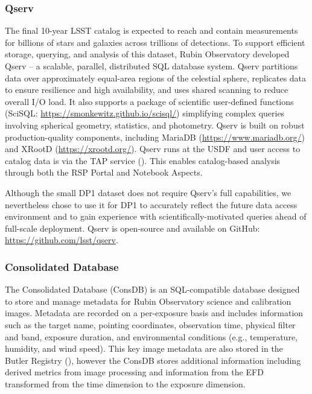 \subsubsection{Qserv}
\label{sssec:qserv}
The final 10-year \gls{LSST} catalog is expected to reach \tenyearcatalogsize and contain measurements for billions of stars and galaxies across trillions of detections.
To support efficient storage, querying, and analysis of this dataset,  Rubin Observatory developed Qserv \citep{Wang:2011:QDS:2063348.2063364, C15_adassxxxii} -- a scalable, parallel, distributed SQL database system.
\gls{Qserv} partitions data over approximately equal-area regions of the celestial sphere, replicates data to ensure resilience and high availability, and uses shared scanning to reduce overall I/O load.
It also supports a package of scientific user-defined functions (SciSQL: \url{https://smonkewitz.github.io/scisql/}) simplifying complex queries involving spherical geometry, statistics, and photometry.
\gls{Qserv} is built on robust production-quality components, including MariaDB (\url{https://www.mariadb.org/}) and XRootD (\url{https://xrootd.org/}).
Qserv runs at the \gls{USDF} and user access to catalog data is via the TAP service ().
This enables catalog-based analysis through both the \gls{RSP} Portal and Notebook Aspects.

Although the small \gls{DP1} dataset does not require Qserv’s full capabilities, we nevertheless chose to use it for \gls{DP1} to accurately reflect the future data access environment and to gain experience with scientifically-motivated queries ahead of full-scale deployment.
\gls{Qserv} is open-source and available on GitHub: \url{https://github.com/lsst/qserv}.

\subsubsection{Consolidated Database}
\label{sssec:consdb}

The Consolidated Database (ConsDB) \citep{dmtn-227} is an SQL-compatible database designed to store and manage metadata for Rubin Observatory science and calibration images.
Metadata are recorded on a per-exposure basis and includes information such as the target name, pointing coordinates, observation time, physical filter and band, exposure duration, and environmental conditions (e.g., temperature, humidity, and wind speed).
This key image metadata are also stored in the Butler Registry (), however the ConsDB stores additional information  including derived metrics from image processing and information from the \gls{EFD} transformed from the time dimension to the exposure dimension.


